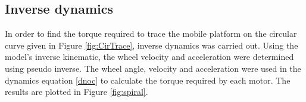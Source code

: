 \subsection{Inverse dynamics}
\label{sec:InvDynamics_NoSlip}
In order to find the torque required to trace the mobile platform on the circular curve given in Figure \ref{fig:CirTrace}, inverse dynamics was carried out.
Using the model's inverse kinematic,  the wheel velocity and acceleration were determined using pseudo inverse.  %
The wheel angle, velocity and acceleration were used in the dynamics equation \ref{dnoc}  to calculate the torque required by each motor. The results are plotted in Figure \ref{fig:spiral}. 

